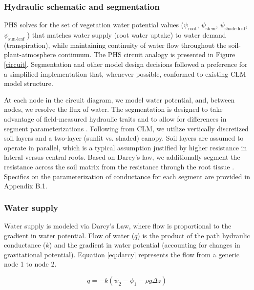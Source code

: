 \documentclass[draft,linenumbers]{agujournal}
\begin{document}
  \subsubsection{Hydraulic schematic and segmentation}
  PHS solves for the set of vegetation water potential values 
  ($\psi_{\text{root}}$, $\psi_{\text{stem}}$, $\psi_{\text{shade-leaf}}$, $\psi_{\text{sun-leaf}}$ ) 
  that matches water supply (root water uptake) to water demand (transpiration), 
  while maintaining continuity of water flow throughout the soil-plant-atmosphere continuum.
  The PHS circuit analogy is presented in Figure \ref{circuit}.
   Segmentation and other model design decisions followed a preference for a simplified implementation that,
  whenever possible, conformed to existing CLM model structure.
  
  At each node in the circuit diagram, we model water potential, and, between nodes, we resolve the flux of water.
  The segmentation is designed to take advantage of field-measured hydraulic traits and to allow for differences
  in segment parameterizations \citep{simonin2015, sperry2015}.
  Following from CLM, we utilize vertically discretized soil layers and a two-layer (sunlit vs. shaded) canopy.
  Soil layers are assumed to operate in parallel, which is a typical assumption justified by higher resistance in lateral versus central roots.
  Based on Darcy's law, we additionally segment the resistance across the soil matrix from the resistance through the root tissue \citep{williams1996}. 
  Specifics on the parameterization of conductance for each segment are provided in Appendix B.1.

    \subsubsection{Water supply}
    \label{sect:supply}
    Water supply is modeled via Darcy's Law, where flow is proportional to the gradient in water potential. 
    Flow of water ($q$) is the product of the path hydraulic conductance ($k$) and 
    the gradient in water potential (accounting for changes in gravitational potential). 
    Equation \ref{eq:darcy} represents the flow from a generic node 1 to node 2. 
    
     \begin{linenomath*}
     \begin{equation}
     \label{eq:darcy}
     q = -k\left(\psi_2 - \psi_1 - \rho g \Delta z\right)
     \end{equation}
     \end{linenomath*}
    
\end{document}
